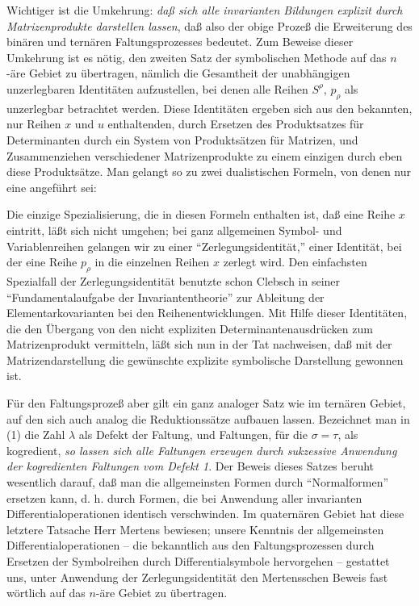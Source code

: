 Wichtiger ist die Umkehrung: \emph{daß sich alle invarianten Bildungen explizit durch Matrizenprodukte darstellen lassen}, daß also der obige Prozeß die Erweiterung des binären und ternären Faltungsprozesses bedeutet. Zum Beweise dieser Umkehrung ist es nötig, den zweiten Satz der symbolischen Methode auf das $n$-äre Gebiet zu übertragen, nämlich die Gesamtheit der unabhängigen unzerlegbaren Identitäten aufzustellen, bei denen alle Reihen $S^\rho$, $p_\rho$ als unzerlegbar betrachtet werden. Diese Identitäten ergeben sich aus den bekannten, nur Reihen $x$ und $u$ enthaltenden, durch Ersetzen des Produktsatzes für Determinanten durch ein System von Produktsätzen für Matrizen, und Zusammenziehen verschiedener Matrizenprodukte zu einem einzigen durch eben diese Produktsätze. Man gelangt so zu zwei dualistischen Formeln, von denen nur eine angeführt sei:

Die einzige Spezialisierung, die in diesen Formeln enthalten ist, daß eine Reihe $x$ eintritt, läßt sich nicht umgehen; bei ganz allgemeinen Symbol- und Variablenreihen gelangen wir zu einer ``Zerlegungsidentität,'' einer Identität, bei der eine Reihe $p_\rho$ in die einzelnen Reihen $x$ zerlegt wird. Den einfachsten Spezialfall der Zerlegungsidentität benutzte schon Clebsch in seiner ``Fundamentalaufgabe der Invariantentheorie'' zur Ableitung der Elementarkovarianten bei den Reihenentwicklungen. Mit Hilfe dieser Identitäten, die den Übergang von den nicht expliziten Determinantenausdrücken zum Matrizenprodukt vermitteln, läßt sich nun in der Tat nachweisen, daß mit der Matrizendarstellung die gewünschte explizite symbolische Darstellung gewonnen ist.

Für den Faltungsprozeß aber gilt ein ganz analoger Satz wie im ternären Gebiet, auf den sich auch analog die Reduktionssätze aufbauen lassen. Bezeichnet man in (1) die Zahl $\lambda$ als Defekt der Faltung, und Faltungen, für die $\sigma=\tau$, als kogredient, \emph{so lassen sich alle Faltungen erzeugen durch sukzessive Anwendung der kogredienten Faltungen vom Defekt 1}. Der Beweis dieses Satzes beruht wesentlich darauf, daß man die allgemeinsten Formen durch ``Normalformen'' ersetzen kann, d. h. durch Formen, die bei Anwendung aller invarianten Differentialoperationen identisch verschwinden. Im quaternären Gebiet hat diese letztere Tatsache Herr Mertens bewiesen; unsere Kenntnis der allgemeinsten Differentialoperationen -- die bekanntlich aus den Faltungsprozessen durch Ersetzen der Symbolreihen durch Differentialsymbole hervorgehen -- gestattet uns, unter Anwendung der Zerlegungsidentität den Mertensschen Beweis fast wörtlich auf das $n$-äre Gebiet zu übertragen.

